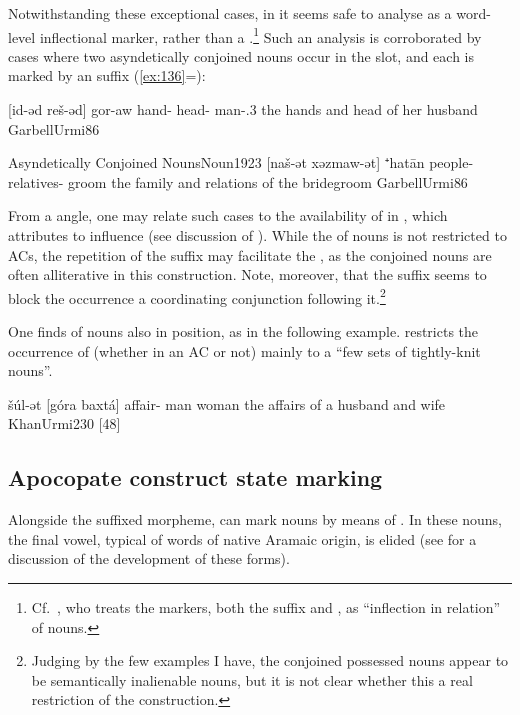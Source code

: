 Notwithstanding these exceptional cases, in \JUrm it seems safe to analyse \ed as a word-level inflectional marker, rather than a .\footnote{Cf.\ \citet[54, \S 2.12.2]{GarbellUrmi}, who treats the \cst* markers, both the \ed suffix and , as \enquote{inflection in relation} of nouns.} Such an analysis is corroborated by cases where two asyndetically conjoined nouns occur in the \prim slot, and each is marked by an \ed suffix (\ref{ex:136}=):

{[id-əd reš-əd] gor-aw}
{hand-\cst{} head-\cst{} man-\poss.3\fem}
{the hands and head of her husband}
{GarbellUrmi}{86}

\acex
{Asyndetically Conjoined Nouns}{Noun}{1923}
{[naš-ət xəzmaw-ət] ⁺hatān}
{people-\cst{} relatives-\cst{} groom}
{the family and relations of the bridegroom}
{GarbellUrmi}{86}

From a  angle, one may relate such cases to the availability of  in \JUrm,  which \citet[171]{Garbell1965impact} attributes to \Azr influence (see discussion of ). While the  of nouns is not restricted to ACs, the repetition of the \ed suffix may facilitate the , as the conjoined nouns are often alliterative in this construction. Note, moreover, that the \ed suffix seems to block the occurrence a coordinating conjunction following it.\footnote{Judging by the few examples I have, the conjoined possessed nouns appear to be semantically inalienable nouns, but it is not clear whether this a real restriction of the construction.}

\largerpage
One finds  of nouns  also in \secn position, as in the following example. \citet[235]{KhanUrmi} restricts the occurrence of  (whether in an AC or not) mainly to a \enquote{few sets of tightly-knit nouns}.

{šúl-ət [góra baxtá]}
{affair-\cst{} man woman}
{the affairs of a husband and wife}
{KhanUrmi}{230 {[48]}}



 
\clearpage 
\subsection{Apocopate construct state marking} 
\largerpage
Alongside the suffixed \cst* \ed morpheme, \JUrm can mark \cst* nouns by means of . In these nouns, the final \free*  vowel, typical of words of native Aramaic origin, is elided (see  for a discussion of the development of these forms). 

